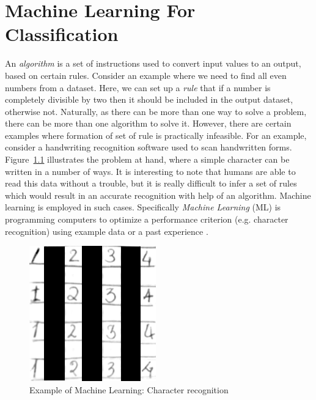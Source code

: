 \chapter{Machine Learning For Classification}
\label{chap:chapter3}
An \emph{algorithm} is a set of instructions used to convert input values to an output, based on certain rules. Consider an example where we need to find all even numbers from a dataset. Here, we can set up a \emph{rule} that if a number is completely divisible by two then it should be included in the output dataset, otherwise not. Naturally, as there can be more than one way to solve a problem, there can be more than one algorithm to solve it. However, there are certain examples where formation of set of rule is practically infeasible. For an example, consider a handwriting recognition software used to scan handwritten forms. Figure~\ref{fig:charrec} illustrates the problem at hand, where a simple character can be written in a number of ways. It is interesting to note that humans are able to read this data without a trouble, but it is really difficult to infer a set of rules which would result in an accurate recognition with help of an algorithm. Machine learning is employed in such cases. Specifically \emph{Machine Learning} (ML) is programming computers to optimize a performance criterion (e.g. character recognition) using example data or a past experience \cite{Alpaydin2004}. 

\begin{figure}[h]
  \begin{center}
    \captionsetup{justification=centering}
    \includegraphics[scale=0.5]{figures/charrec.png}
    \caption{Example of Machine Learning: Character recognition}
    \label{fig:charrec}
  \end{center}
\end{figure}

